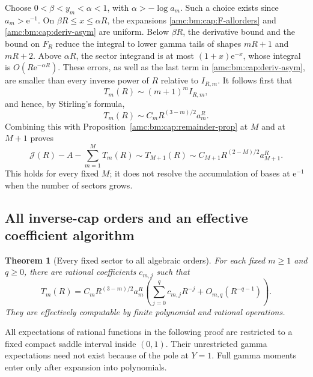 \documentclass[11pt,letterpaper]{article}
\newtheorem{theorem}{Theorem}[section]
\theoremstyle{remark}\newtheorem{remark}[theorem]{Remark}
\newcommand{\ee}{\mathrm e}
\begin{document}
Choose $0<\beta<y_m<\alpha<1$, with $\alpha>-\log a_m$. Such a choice exists since $a_m>\ee^{-1}$. On $\beta R\le x\le\alpha R$, the expansions \eqref{amc:bm:cap:F-allorders} and \eqref{amc:bm:cap:deriv-asym} are uniform. Below $\beta R$, the derivative bound and the bound on $F_R$ reduce the integral to lower gamma tails of shapes $mR+1$ and $mR+2$. Above $\alpha R$, the sector integrand is at most $(1+x)\ee^{-x}$, whose integral is $O(R\ee^{-\alpha R})$. These errors, as well as the last term in \eqref{amc:bm:cap:deriv-asym}, are smaller than every inverse power of $R$ relative to $I_{R,m}$. It follows first that
\[
 T_m(R)\sim(m+1)^m I_{R,m},
\]
and hence, by Stirling's formula,
\begin{equation}\label{amc:bm:cap:sector-leading}
 T_m(R)\sim C_m R^{(3-m)/2}a_m^R.
\end{equation}
Combining this with Proposition~\ref{amc:bm:cap:remainder-prop} at $M$ and at $M+1$ proves
\begin{equation}\label{amc:bm:cap:remainder-equivalent}
 \mathcal J(R)-A-\sum_{m=1}^MT_m(R)
 \sim T_{M+1}(R)
 \sim C_{M+1}R^{(2-M)/2}a_{M+1}^R.
\end{equation}
This holds for every fixed $M$; it does not resolve the accumulation of bases at $\ee^{-1}$ when the number of sectors grows.

\subsection{All inverse-cap orders and an effective coefficient algorithm}
\begin{theorem}[Every fixed sector to all algebraic orders]\label{amc:bm:cap:allorders-theorem}
For each fixed $m\ge1$ and $q\ge0$, there are rational coefficients $c_{m,j}$ such that
\begin{equation}\label{amc:bm:cap:allorders}
 T_m(R)=C_mR^{(3-m)/2}a_m^R
 \left(\sum_{j=0}^q c_{m,j}R^{-j}+O_{m,q}(R^{-q-1})\right).
\end{equation}
They are effectively computable by finite polynomial and rational operations.
\end{theorem}
All expectations of rational functions in the following proof are restricted to a fixed compact saddle interval inside $(0,1)$. Their unrestricted gamma expectations need not exist because of the pole at $Y=1$. Full gamma moments enter only after expansion into polynomials.
\end{document}
